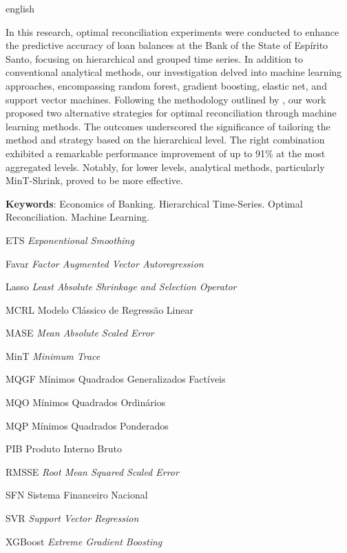 \begin{resumo}[Abstract]
  \begin{otherlanguage*}{english}
    
In this research, optimal reconciliation experiments were conducted to enhance the predictive accuracy of loan balances at the Bank of the State of Espírito Santo, focusing on hierarchical and grouped time series. In addition to conventional analytical methods, our investigation delved into machine learning approaches, encompassing random forest, gradient boosting, elastic net, and support vector machines. Following the methodology outlined by \textcite{spiliotis_hierarchical_2021}, our work proposed two alternative strategies for optimal reconciliation through machine learning methods. The outcomes underscored the significance of tailoring the method and strategy based on the hierarchical level. The right combination exhibited a remarkable performance improvement of up to 91\% at the most aggregated levels. Notably, for lower levels, analytical methods, particularly MinT-Shrink, proved to be more effective.
    \vspace{\onelineskip}
 
    \noindent 
    \textbf{Keywords}: Economics of Banking. Hierarchical Time-Series. Optimal Reconciliation. Machine Learning.
  \end{otherlanguage*}
\end{resumo}

\listoffigures*
\cleardoublepage


\listoftables*
\cleardoublepage

\begin{siglas}
  \item[ETS] \textit{Exponentional Smoothing}
  \item[Favar] \textit{Factor Augmented Vector Autoregression}
  \item[Lasso] \textit{Least Absolute Shrinkage and Selection Operator}
  \item[MCRL] Modelo Clássico de Regressão Linear
  \item[MASE] \textit{Mean Absolute Scaled Error}
  \item[MinT] \textit{Minimum Trace}
  \item[MQGF] Mínimos Quadrados Generalizados Factíveis
  \item[MQO] Mínimos Quadrados Ordinários
  \item[MQP] Mínimos Quadrados Ponderados
  \item[PIB] Produto Interno Bruto
  \item[RMSSE] \textit{Root Mean Squared Scaled Error}
  \item[SFN] Sistema Financeiro Nacional
  \item[SVR] \textit{Support Vector Regression}
  \item[XGBoost] \textit{Extreme Gradient Boosting}
\end{siglas}

